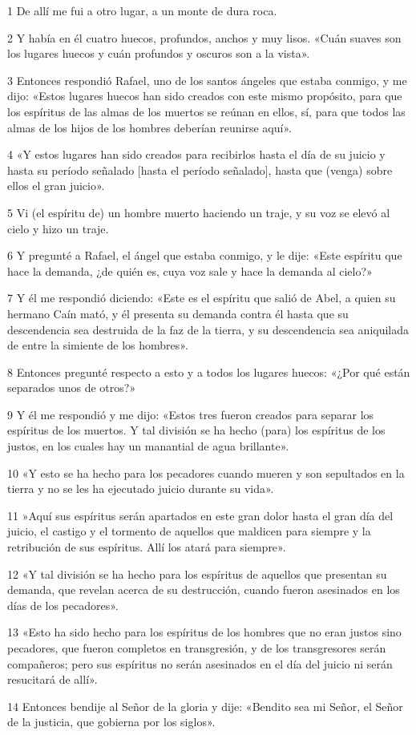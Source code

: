 \par 1 De allí me fui a otro lugar, a un monte de dura roca.
\par 2 Y había en él cuatro huecos, profundos, anchos y muy lisos. «Cuán suaves son los lugares huecos y cuán profundos y oscuros son a la vista».
\par 3 Entonces respondió Rafael, uno de los santos ángeles que estaba conmigo, y me dijo: «Estos lugares huecos han sido creados con este mismo propósito, para que los espíritus de las almas de los muertos se reúnan en ellos, sí, para que todos las almas de los hijos de los hombres deberían reunirse aquí».
\par 4 «Y estos lugares han sido creados para recibirlos hasta el día de su juicio y hasta su período señalado [hasta el período señalado], hasta que (venga) sobre ellos el gran juicio».
\par 5 Vi (el espíritu de) un hombre muerto haciendo un traje, y su voz se elevó al cielo y hizo un traje.
\par 6 Y pregunté a Rafael, el ángel que estaba conmigo, y le dije: «Este espíritu que hace la demanda, ¿de quién es, cuya voz sale y hace la demanda al cielo?»
\par 7 Y él me respondió diciendo: «Este es el espíritu que salió de Abel, a quien su hermano Caín mató, y él presenta su demanda contra él hasta que su descendencia sea destruida de la faz de la tierra, y su descendencia sea aniquilada de entre la simiente de los hombres».
\par 8 Entonces pregunté respecto a esto y a todos los lugares huecos: «¿Por qué están separados unos de otros?»
\par 9 Y él me respondió y me dijo: «Estos tres fueron creados para separar los espíritus de los muertos. Y tal división se ha hecho (para) los espíritus de los justos, en los cuales hay un manantial de agua brillante».
\par 10 «Y esto se ha hecho para los pecadores cuando mueren y son sepultados en la tierra y no se les ha ejecutado juicio durante su vida».
\par 11 »Aquí sus espíritus serán apartados en este gran dolor hasta el gran día del juicio, el castigo y el tormento de aquellos que maldicen para siempre y la retribución de sus espíritus. Allí los atará para siempre».
\par 12 «Y tal división se ha hecho para los espíritus de aquellos que presentan su demanda, que revelan acerca de su destrucción, cuando fueron asesinados en los días de los pecadores».
\par 13 «Esto ha sido hecho para los espíritus de los hombres que no eran justos sino pecadores, que fueron completos en transgresión, y de los transgresores serán compañeros; pero sus espíritus no serán asesinados en el día del juicio ni serán resucitará de allí».
\par 14 Entonces bendije al Señor de la gloria y dije: «Bendito sea mi Señor, el Señor de la justicia, que gobierna por los siglos».

